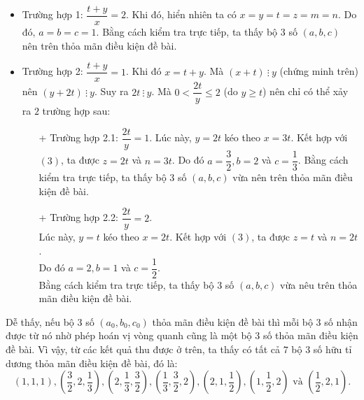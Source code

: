 \begin{bt}
{\begin{itemize}
	\item Trường hợp 1: $ \dfrac{t + y}{x} = 2 $.
	Khi đó, hiển nhiên ta có $ x = y = t = z = m = n. $
	Do đó, $ a = b = c = 1 $.
	Bằng cách kiểm tra trực tiếp, ta thấy bộ $ 3 $ số $ (a,b,c) $ nên trên thỏa mãn điều kiện đề bài.
	\item Trường hợp 2: $ \dfrac{t + y}{x } = 1 $.
	Khi đó $  x = t + y $. Mà $ (x+t) \ \vdots \ y  $ (chứng minh trên) nên $ (y + 2t) \ \vdots \ y  $. Suy ra $ 2t \ \vdots \ y $.
	Mà  $ 0 < \dfrac{2t}{y} \leq 2 $ (do $ y \geq t $) nên chỉ có thể xảy ra $ 2 $ trường hợp sau:
	\begin{itemize}
		\item[+] Trường hợp 2.1: $ \dfrac{2t}{y} = 1 $.
		Lúc này, $ y = 2t $ kéo theo $ x = 3t $. Kết hợp với $ (3) $, ta được $ z = 2t $ và $ n = 3t $.
		Do đó $ a = \dfrac{3}{2}, b = 2 $ và $ c = \dfrac{1}{3} $.
		Bằng cách kiểm tra trực tiếp, ta thấy bộ $ 3 $ số $ (a,b,c) $ vừa nên trên thỏa mãn điều kiện đề bài.
		\item[+] Trường hợp 2.2: $ \dfrac{2t}{y} = 2 $.\\
		Lúc này, $  y = t $ kéo theo $  x = 2t. $ Kết hợp với $ (3) $, ta được $ z = t $ và $ n = 2t $.\\
		Do đó $  a = 2, b  = 1 $ và $ c = \dfrac{1}{2} $.\\
		Bằng cách kiểm tra trực tiếp, ta thấy bộ $ 3 $ số $ (a,b,c) $ vừa nêu trên thỏa mãn điều kiện đề bài.
	\end{itemize}	
\end{itemize}	
Dễ thấy, nếu bộ $ 3 $ số $ (a_0, b_0, c_0) $ thỏa mãn điều kiện đề bài thì mỗi bộ $ 3 $ số nhận được từ nó nhờ phép hoán vị vòng quanh cũng là một bộ $ 3 $ số thỏa mãn điều kiện đề bài. Vì vậy, từ các kết quả thu được ở trên, ta thấy có tất cả $ 7 $ bộ $ 3 $ số hữu tỉ dương thỏa mãn điều kiện đề bài, đó là: $$ (1,1,1), \left ( \dfrac{3}{2}, 2, \dfrac{1}{3} \right ), \left ( 2, \dfrac{1}{3}, \dfrac{3}{2} \right ), \left (\dfrac{1}{3}, \dfrac{3}{2},2 \right ), \left ( 2,1, \dfrac{1}{2} \right ), \left ( 1,\dfrac{1}{2},2 \right ) \text{ và } \left ( \dfrac{1}{2}, 2, 1 \right ). $$



}
\end{bt}
